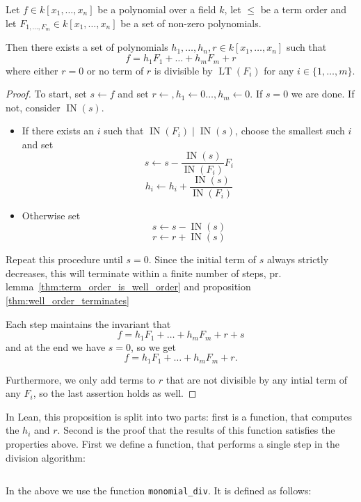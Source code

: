 \documentclass[a4paper, 12pt]{article}
\DeclareMathOperator{\IN}{IN}
\DeclareMathOperator{\LT}{LT}
\newcommand{\lean}[1]{\texttt{#1}}
\theoremstyle{changedot}
\theoremstyle{changedotbreak}
\theoremstyle{nonumberplain}
\newtheorem{proof}{Proof}
\begin{document}
\begin{proposition}
  Let $f \in k[x_{1}, \dots, x_{n}]$ be a polynomial over a field $k$, let $\le$ be a term order and let $F_{1, \dots, F_{m}} \in k[x_{1}, \dots, x_{n}]$ be a set of non-zero polynomials.

  Then there exists a set of polynomials $h_{1}, \dots, h_{n}, r \in k[x_{1}, \dots, x_{n}]$ such that \[f = h_{1}F_{1} + \dots + h_{m} F_{m} + r\] where either $r = 0$ or no term of $r$ is divisible by $\LT(F_{i})$ for any $i \in \{1, \dots, m\}$.
\end{proposition}
\begin{proof}
  To start, set $s \leftarrow f$ and set $r \leftarrow, h_{1} \leftarrow 0 \dots, h_{m} \leftarrow 0$. If $s = 0$ we are done. If not, consider $\IN(s)$.

  \begin{itemize}
    \item If there exists an $i$ such that $\IN(F_{i}) \mid \IN(s)$, choose the smallest such $i$ and set
      \[s \leftarrow s - \frac{\IN(s)}{\IN(F_{i})} F_{i}\]
      \[h_{i} \leftarrow h_{i} + \frac{\IN(s)}{\IN(F_{i})}\]
    \item Otherwise set
      \[s \leftarrow s - \IN(s)\]
      \[r \leftarrow r + \IN(s)\]
  \end{itemize}

  Repeat this procedure until $s = 0$. Since the initial term of $s$ always strictly decreases, this will terminate within a finite number of steps, pr. lemma~\ref{thm:term_order_is_well_order} and proposition \ref{thm:well_order_terminates}

  Each step maintains the invariant that \[f = h_{1}F_{1} + \dots + h_{m}F_{m} + r + s\] and at the end we have $s = 0$, so we get \[f = h_{1}F_{1} + \dots + h_{m}F_{m} + r.\]

  Furthermore, we only add terms to $r$ that are not divisible by any intial term of any $F_{i}$, so the last assertion holds as well.
\end{proof}

In Lean, this proposition is split into two parts: first is a function, that computes the $h_{i}$ and $r$. Second is the proof that the results of this function satisfies the properties above. First we define a function, that performs a single step in the division algorithm:

\inputminted[firstline=48, lastline=59]{lean}{../src/mv_division.lean}

In the above we use the function \lean{monomial_div}. It is defined as follows:
\end{document}
